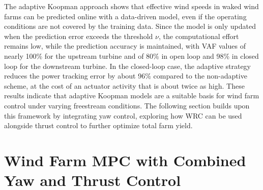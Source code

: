 The adaptive Koopman approach shows that effective wind speeds in waked wind farms can be predicted online with a data-driven model, even if the operating conditions are not covered by the training data. Since the model is only updated when the prediction error exceeds the threshold $\nu$, the computational effort remains low, while the prediction accuracy is maintained, with VAF values of nearly 100\% for the upstream turbine and of 80\% in open loop and 98\% in closed loop for the downstream turbine. In the closed-loop case, the adaptive strategy reduces the power tracking error by about 96\% compared to the non-adaptive scheme, at the cost of an actuator activity that is about twice as high. These results indicate that adaptive Koopman models are a suitable basis for wind farm control under varying freestream conditions. The following section builds upon this framework by integrating yaw control, exploring how WRC can be used alongside thrust control to further optimize total farm yield.


\section{Wind Farm MPC with Combined Yaw and Thrust Control} 
\label{sec:WindFarmLinearMPCforWRC-AIC}

